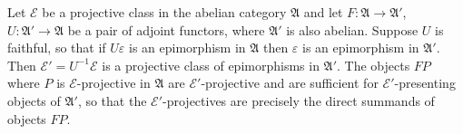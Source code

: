Let $\mathcal{E}$ be a projective class in the abelian category $\mathfrak{A}$ and let $F: \mathfrak{A} \rightarrow \mathfrak{A}'$, $U: \mathfrak{A}' \rightarrow \mathfrak{A}$ be a pair of adjoint functors, where $\mathfrak{A}'$ is also abelian. Suppose $U$ is faithful, so that if $U\varepsilon$ is an epimorphism in $\mathfrak{A}$ then $\varepsilon$ is an epimorphism in $\mathfrak{A}'$. Then $\mathcal{E}' = U^{-1}\mathcal{E}$ is a projective class of epimorphisms in $\mathfrak{A}'$. The objects $FP$ where $P$ is $\mathcal{E}$-projective in $\mathfrak{A}$ are $\mathcal{E}'$-projective and are sufficient for $\mathcal{E}'$-presenting objects of $\mathfrak{A}'$, so that the $\mathcal{E}'$-projectives are precisely the direct summands of objects $FP$.
